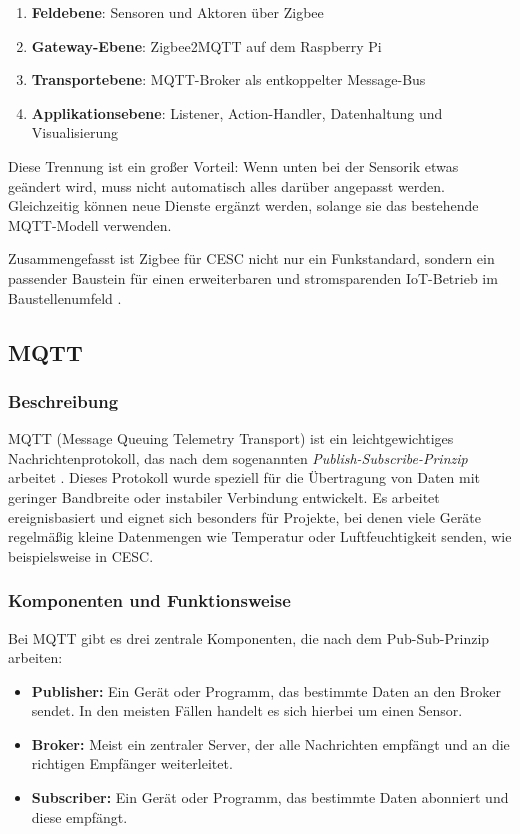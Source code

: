 \begin{enumerate}
    \item \textbf{Feldebene}: Sensoren und Aktoren über Zigbee
    \item \textbf{Gateway-Ebene}: Zigbee2MQTT auf dem Raspberry Pi
    \item \textbf{Transportebene}: MQTT-Broker als entkoppelter Message-Bus
    \item \textbf{Applikationsebene}: Listener, Action-Handler, Datenhaltung und Visualisierung
\end{enumerate}

Diese Trennung ist ein großer Vorteil: Wenn unten bei der Sensorik etwas geändert wird, muss nicht automatisch alles darüber angepasst werden. Gleichzeitig können neue Dienste ergänzt werden, solange sie das bestehende MQTT-Modell verwenden.

Zusammengefasst ist Zigbee für CESC nicht nur ein Funkstandard, sondern ein passender Baustein für einen erweiterbaren und stromsparenden IoT-Betrieb im Baustellenumfeld \cite{csa_zigbee_overview}.

\subsection{MQTT}



\subsubsection{Beschreibung}
MQTT (Message Queuing Telemetry Transport) ist ein leichtgewichtiges Nachrichtenprotokoll, das nach dem sogenannten \textit{Publish-Subscribe-Prinzip} arbeitet \cite{mqtt_org}. Dieses Protokoll wurde speziell für die Übertragung von Daten mit geringer Bandbreite oder instabiler Verbindung entwickelt. Es arbeitet ereignisbasiert und eignet sich besonders für Projekte, bei denen viele Geräte regelmäßig kleine Datenmengen wie Temperatur oder Luftfeuchtigkeit senden, wie beispielsweise in CESC.

\subsubsection{Komponenten und Funktionsweise}
Bei MQTT gibt es drei zentrale Komponenten, die nach dem Pub-Sub-Prinzip arbeiten:

\begin{itemize}
    \item \textbf{Publisher:} Ein Gerät oder Programm, das bestimmte Daten an den Broker sendet. In den meisten Fällen handelt es sich hierbei um einen Sensor.
    \item \textbf{Broker:} Meist ein zentraler Server, der alle Nachrichten empfängt und an die richtigen Empfänger weiterleitet.
    \item \textbf{Subscriber:} Ein Gerät oder Programm, das bestimmte Daten abonniert und diese empfängt.
\end{itemize}

